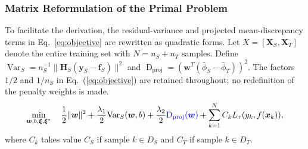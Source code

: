\documentclass[a4paper]{cas-sc}
\begin{document}
\subsubsection{Matrix Reformulation of the Primal Problem}
{\color{blue}To facilitate the derivation, the residual-variance and projected mean-discrepancy terms in Eq.~\eqref{eq:objective} are rewritten as quadratic forms.} Let $X = [\boldsymbol{X}_S, \boldsymbol{X}_T]$ denote the entire training set with $N = n_S + n_T$ samples.
{\color{blue}Define $\operatorname{Var}_S=n_S^{-1}\|\boldsymbol{H}_S(\boldsymbol{y}_S-\boldsymbol{f}_S)\|^2$ and $\operatorname{D}_{\mathrm{proj}}=(\boldsymbol{w}^T(\bar\phi_S-\bar\phi_T))^2$. The factors $1/2$ and $1/n_S$ in Eq.~(\ref{eq:objective}) are retained throughout; no redefinition of the penalty weights is made.}
\begin{equation}
\label{eq:primal_matrix}
\min_{\boldsymbol{w}, b, \boldsymbol{\xi}, \boldsymbol{\xi}^*} \quad \frac{1}{2} \|\boldsymbol{w}\|^2 + \frac{\lambda_1}{2} \text{Var}_S(\boldsymbol{w}, b) + \frac{\lambda_2}{2} {\color{blue}\operatorname{D}_{\mathrm{proj}}(\boldsymbol{w})} + \sum_{k=1}^N C_k L_\tau(y_k, f(\boldsymbol{x}_k)),
\end{equation}
where $C_k$ takes value $C_S$ if sample $k \in D_S$ and $C_T$ if sample $k \in D_T$.
\end{document}
